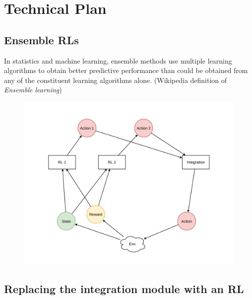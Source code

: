 



\section*{Technical Plan}

\subsection{Ensemble RLs}
In statistics and machine learning, ensemble methods use multiple learning algorithms to obtain better predictive performance than could be obtained from any of the constituent learning algorithms alone. (Wikipedia definition of \emph{Ensemble learning})

\begin{figure}[h]
    \includegraphics[width=\textwidth]{images/step_1.pdf}
\end{figure}

\newpage
\subsection{Replacing the integration module with an RL}

